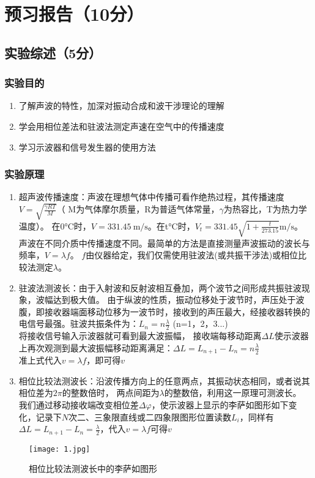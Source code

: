 \documentclass{../template/Report}
\begin{document}
\maketitle

\section{预习报告（10分）}
\subsection{实验综述（5分）}
\subsubsection{实验目的}
\begin{enumerate}
	\item 了解声波的特性，加深对振动合成和波干涉理论的理解
	\item 学会用相位差法和驻波法测定声速在空气中的传播速度
	\item 学习示波器和信号发生器的使用方法
\end{enumerate}
\subsubsection{实验原理}
\begin{enumerate}
	\item 超声波传播速度：声波在理想气体中传播可看作绝热过程，其传播速度$V=\sqrt{\frac{\gamma RT}{M}}$（
	      M为气体摩尔质量，R为普适气体常量，$\gamma$为热容比，T为热力学温度）。
	      在0$\si{\degreeCelsius}$时，$V=\SI{331.45}{\metre\per\second}$。在t$\si{\degreeCelsius}$时，$V_t = 331.45\sqrt{1+\frac{t}{273.15}}\si{\metre\per\second}$。
	      声波在不同介质中传播速度不同。最简单的方法是直接测量声波振动的波长与频率，$V=\lambda f$。
	      $f$由仪器给定，我们仅需使用驻波法(或共振干涉法)或相位比较法测定$\lambda$。
	\item 驻波法测波长：由于入射波和反射波相互叠加，两个波节之间形成共振驻波现象，波幅达到极大值。
	      由于纵波的性质，振动位移处于波节时，声压处于波腹，即接收器端面移动位移为一波节时，接收到的声压最大，经接收器转换的电信号最强。驻波共振条件为：$L_n = n\frac{\lambda}{2}$ (n=1，2，3...)\\
	      将接收信号输入示波器就可看到最大波振幅，
	      接收端每移动距离$\Delta L$使示波器上再次观测到最大波振幅移动距离满足：$\Delta L = L_{n+1} - L_n = n\frac{\lambda}{2}$\\
	      准上式代入$v=\lambda f$，即可得$v$
	\item 相位比较法测波长：沿波传播方向上的任意两点，其振动状态相同，或者说其相位差为$2\pi$的整数倍时，
	      两点间距为$\lambda$的整数倍，利用这一原理可测波长。
	      我们通过移动接收端改变相位差$\Delta\varphi$，使示波器上显示的李萨如图形如下变化，记录下$N$次二、三象限直线或二四象限图形位置读数$L_i$，同样有$\Delta L = L_{n+1} - L_n = \frac{\lambda}{2}$，代入$v=\lambda f$可得$v$
\end{enumerate}
\begin{figure}[H]
	\centering
	\texttt{[image: 1.jpg]}
	\caption{相位比较法测波长中的李萨如图形}
\end{figure}
\end{document}
